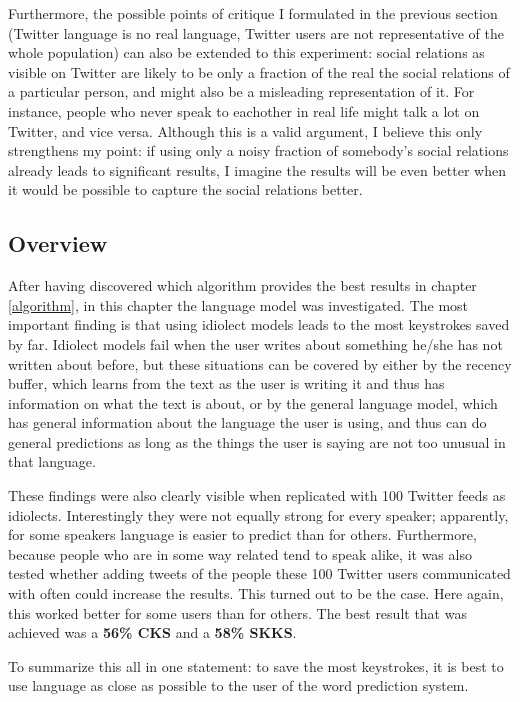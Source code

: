 \documentclass[12pt]{article}
\begin{document}
Furthermore, the possible points of critique I formulated in the previous section (Twitter language is no real language, Twitter users are not representative of the whole population) can also be extended to this experiment: social relations as visible on Twitter are likely to be only a fraction of the real the social relations of a particular person, and might also be a misleading representation of it. For instance, people who never speak to eachother in real life might talk a lot on Twitter, and vice versa. Although this is a valid argument, I believe this only strengthens my point: if using only a noisy fraction of somebody's social relations already leads to significant results, I imagine the results will be even better when it would be possible to capture the social relations better.

\subsection{Overview}
After having discovered which algorithm provides the best results in chapter \ref{algorithm}, in this chapter the language model was investigated. The most important finding is that using idiolect models leads to the most keystrokes saved by far. Idiolect models fail when the user writes about something he/she has not written about before, but these situations can be covered by either by the recency buffer, which learns from the text as the user is writing it and thus has information on what the text is about, or by the general language model, which has general information about the language the user is using, and thus can do general predictions as long as the things the user is saying are not too unusual in that language. 

These findings were also clearly visible when replicated with 100 Twitter feeds as idiolects. Interestingly they were not equally strong for every speaker; apparently, for some speakers language is easier to predict than for others. Furthermore, because people who are in some way related tend to speak alike, it was also tested whether adding tweets of the people these 100 Twitter users communicated with often could increase the results. This turned out to be the case. Here again, this worked better for some users than for others. The best result that was achieved was a \textbf{56\% CKS} and a \textbf{58\% SKKS}.

To summarize this all in one statement: to save the most keystrokes, it is best to use language as close as possible to the user of the word prediction system.
\end{document}
